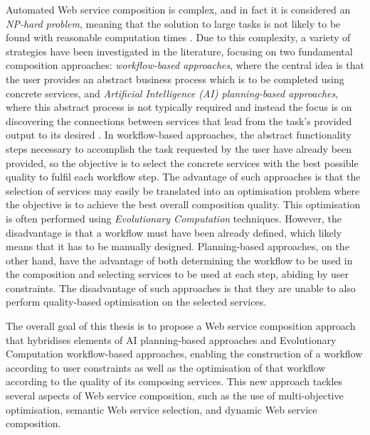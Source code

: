 Automated Web service composition is complex, and in fact it is considered an \textit{NP-hard problem}, meaning that the solution to large tasks is not likely to be found with reasonable computation times \cite{moghaddam2014service}. Due to this complexity, a variety of strategies have been investigated in the literature, focusing on two fundamental composition approaches: \textit{workflow-based approaches}, where the central idea is that the user provides an abstract business process which is to be completed using concrete services, and \textit{Artificial Intelligence (AI) planning-based approaches}, where this abstract process is not typically required and instead the focus is on discovering the connections between services that lead from the task's provided output to its desired \cite{moghaddam2014service}. In workflow-based approaches, the abstract functionality steps necessary to accomplish the task requested by the user have already been provided, so the objective is to select the concrete services with the best possible quality to fulfil each workflow step. The advantage of such approaches is that the selection of services may easily be translated into an optimisation problem where the objective is to achieve the best overall composition quality. This optimisation is often performed using \textit{Evolutionary Computation} techniques. However, the disadvantage is that a workflow must have been already defined, which likely means that it has to be manually designed. Planning-based approaches, on the other hand, have the advantage of both determining the workflow to be used in the composition and selecting services to be used at each step, abiding by user constraints. The disadvantage of such approaches is that they are unable to also perform quality-based optimisation on the selected services.

The overall goal of this thesis is to propose a Web service composition approach that hybridises elements of AI planning-based approaches and Evolutionary Computation workflow-based approaches, enabling the construction of a workflow according to user constraints as well as the optimisation of that workflow according to the quality of its composing services. This new approach tackles several aspects of Web service composition, such as the use of multi-objective optimisation, semantic Web service selection, and dynamic Web service composition.

